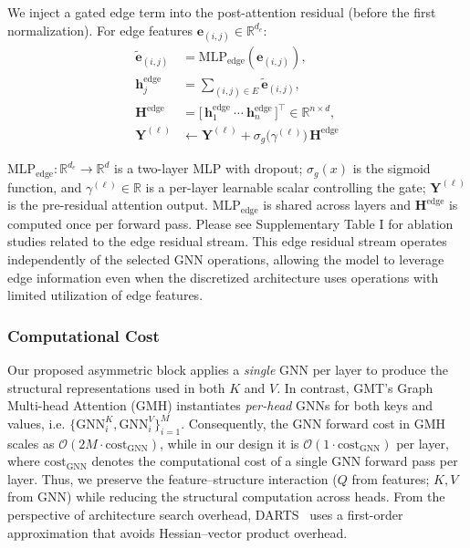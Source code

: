 \documentclass[lettersize,journal]{IEEEtran}
\begin{document}
We inject a gated edge term into the post-attention residual (before the first normalization). For edge features $\mathbf{e}_{(i,j)}\!\in\!\mathbb{R}^{d_e}$:
\begin{align}
\tilde{\mathbf{e}}_{(i,j)} &= \mathrm{MLP}_{\text{edge}}\!\left(\mathbf{e}_{(i,j)}\right),\\
\mathbf{h}_j^{\text{edge}} &= \sum_{(i,j)\in E} \tilde{\mathbf{e}}_{(i,j)},\\
\mathbf{H}^{\text{edge}} &= \big[\,\mathbf{h}_1^{\text{edge}}\ \cdots\ \mathbf{h}_n^{\text{edge}}\,\big]^{\top}\!\in\!\mathbb{R}^{n\times d},\\
\mathbf{Y}^{(\ell)} &\gets  \mathbf{Y}^{(\ell)} + \sigma_g\!\big(\gamma^{(\ell)}\big)\,\mathbf{H}^{\text{edge}}
\end{align}

$\mathrm{MLP}_{\text{edge}}:\mathbb{R}^{d_e}\!\to\!\mathbb{R}^{d}$ is a two-layer MLP with dropout; $\sigma_g(x)$ is the sigmoid function, and $\gamma^{(\ell)}\!\in\!\mathbb{R}$ is a per-layer learnable scalar controlling the gate; $\mathbf{Y}^{(\ell)}$ is the pre-residual attention output. $\mathrm{MLP}_{\text{edge}}$ is shared across layers and $\mathbf{H}^{\text{edge}}$ is computed once per forward pass. Please see Supplementary Table I for ablation studies related to the edge residual stream.
This edge residual stream operates independently of the selected GNN operations, allowing the model to leverage edge information even when the discretized architecture uses operations with limited utilization of edge features.


\subsubsection{Computational Cost}

Our proposed asymmetric block applies a \emph{single} GNN per layer to produce the structural representations used in both $K$ and $V$. In contrast, GMT’s Graph Multi-head Attention (GMH) \cite{baek_accurate_2021} instantiates \emph{per-head} GNNs for both keys and values, i.e. $\{\mathrm{GNN}^{K}_i,\mathrm{GNN}^{V}_i\}_{i=1}^M$. Consequently, the GNN forward cost in GMH scales as $\mathcal{O}(2M \cdot \text{cost}_\text{GNN})$, while in our design it is $\mathcal{O}(1 \cdot \text{cost}_\text{GNN})$ per layer, where $\text{cost}_\text{GNN}$ denotes the computational cost of a single GNN forward pass per layer. Thus, we preserve the feature–structure interaction ($Q$ from features; $K,V$ from GNN) while reducing the structural computation across heads.
From the perspective of architecture search overhead, DARTS~\cite{liu_darts_2019} uses a first-order approximation that avoids Hessian–vector product overhead.
\end{document}
